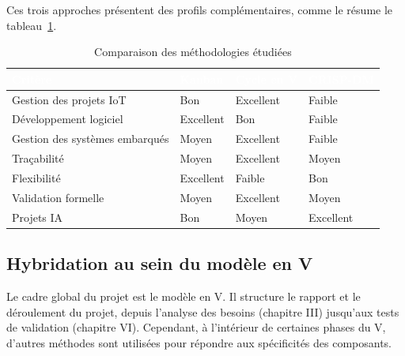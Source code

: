 Ces trois approches présentent des profils complémentaires, comme le résume le tableau~\ref{tab:comparaison_methodologies}.

\begin{table}[!htbp]
	\centering
	\small
	\renewcommand{\arraystretch}{1.5}
	\begin{tabularx}{\textwidth}{|p{}|X|X|X|}
		\hline
		\rowcolor[HTML]{2C3E50}
		\textcolor{white}{\textbf{Critère}} & \textcolor{white}{\textbf{Kanban}} & \textcolor{white}{\textbf{Cycle en V}} & \textcolor{white}{\textbf{CRISP-DM}} \\ \hline
		\rowcolor[HTML]{EFEFEF}
		Gestion des projets IoT & Bon & Excellent & Faible \\ \hline
		Développement logiciel & Excellent & Bon & Faible \\ \hline
		\rowcolor[HTML]{EFEFEF}
		Gestion des systèmes embarqués & Moyen & Excellent & Faible \\ \hline
		Traçabilité & Moyen & Excellent & Moyen \\ \hline
		\rowcolor[HTML]{EFEFEF}
		Flexibilité & Excellent & Faible & Bon \\ \hline
		Validation formelle & Moyen & Excellent & Moyen \\ \hline
		\rowcolor[HTML]{EFEFEF}
		Projets IA & Bon & Moyen & Excellent \\ \hline
	\end{tabularx}
	\caption{Comparaison des méthodologies étudiées}
	\label{tab:comparaison_methodologies}
\end{table}

\subsection{Hybridation au sein du modèle en V}

Le cadre global du projet est le modèle en V. Il structure le rapport et le déroulement du projet, depuis l’analyse des besoins (chapitre III) jusqu’aux tests de validation (chapitre VI). Cependant, à l’intérieur de certaines phases du V, d’autres méthodes sont utilisées pour répondre aux spécificités des composants.

